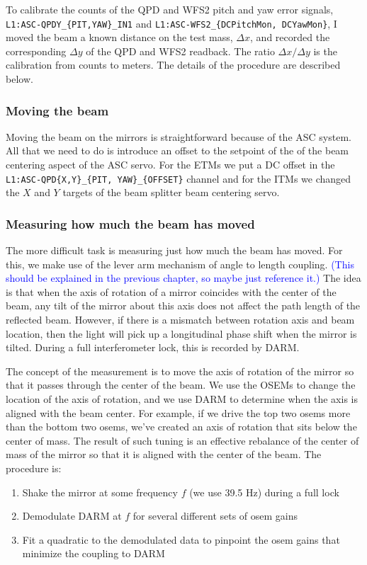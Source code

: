To calibrate the counts of the QPD and WFS2 pitch and yaw error
signals, \linebreak \texttt{L1:ASC-QPDY\_\{PIT,YAW\}\_IN1} and
\texttt{L1:ASC-WFS2\_\{DCPitchMon, DCYawMon\}}, I moved the beam a
known distance on the test mass, $\Delta x$, and recorded the
corresponding $\Delta y$ of the QPD and WFS2 readback. The ratio
$\Delta x /\Delta y$ is the calibration from counts to meters. The
details of the procedure are described below.


\subsubsection{Moving the beam} 
Moving the beam on the mirrors is straightforward because of the ASC
system. All that we need to do is introduce an offset to the setpoint
of the of the beam centering aspect of the ASC servo. For the ETMs we
put a DC offset in the \texttt{L1:ASC-QPD\{X,Y\}\_\{PIT,
  YAW\}\_\{OFFSET\}} channel and for the ITMs we changed the $X$ and
$Y$ targets of the beam splitter beam centering servo.

\subsubsection{Measuring how much the beam has moved} 
The more difficult task is measuring just how much the beam has
moved. For this, we make use of the lever arm mechanism of angle to
length coupling. \textcolor{blue}{(This should be explained in the
  previous chapter, so maybe just reference it.)} The idea is that
when the axis of rotation of a mirror coincides with the center of the
beam, any tilt of the mirror about this axis does not affect the path
length of the reflected beam. However, if there is a mismatch between
rotation axis and beam location, then the light will pick up a
longitudinal phase shift when the mirror is tilted. During a full
interferometer lock, this is recorded by DARM.

The concept of the measurement is to move the axis of rotation of the
mirror so that it passes through the center of the beam. We use the
OSEMs to change the location of the axis of rotation, and we use DARM
to determine when the axis is aligned with the beam center. For
example, if we drive the top two osems more than the bottom two osems,
we've created an axis of rotation that sits below the center of
mass. The result of such tuning is an effective rebalance of the
center of mass of the mirror so that it is aligned with the center of
the beam. The procedure is:
\begin{enumerate}
\item Shake the mirror at some frequency $f$ (we use
39.5 Hz) during a full lock \vspace{-10pt}
\item Demodulate DARM at $f$ for several different sets of osem gains \vspace{-10pt}
\item Fit a quadratic to the demodulated data to pinpoint the osem gains that
  minimize the coupling to DARM
\end{enumerate}

